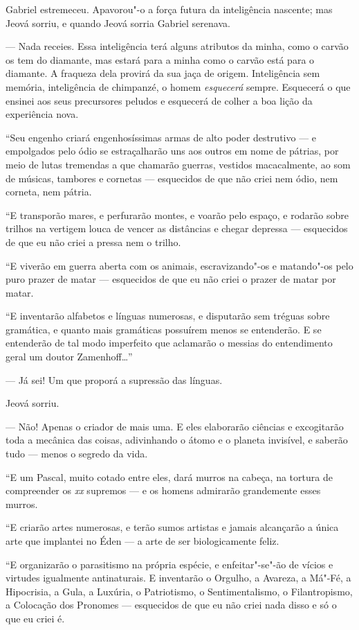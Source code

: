 Gabriel estremeceu. Apavorou"-o a força futura da inteligência nascente;
mas Jeová sorriu, e quando Jeová sorria Gabriel serenava.

--- Nada receies. Essa inteligência terá alguns atributos da minha, como
o carvão os tem do diamante, mas estará para a minha como o carvão está
para o diamante. A fraqueza dela provirá da sua jaça de origem.
Inteligência sem memória, inteligência de chimpanzé, o homem
\emph{esquecerá} sempre. Esquecerá o que ensinei aos seus precursores
peludos e esquecerá de colher a boa lição da experiência nova.

``Seu engenho criará engenhosíssimas armas de alto poder destrutivo ---
e empolgados pelo ódio se estraçalharão uns aos outros em nome de
pátrias, por meio de lutas tremendas a que chamarão guerras, vestidos
macacalmente, ao som de músicas, tambores e cornetas --- esquecidos de
que não criei nem ódio, nem corneta, nem pátria.

``E transporão mares, e perfurarão montes, e voarão pelo espaço, e
rodarão sobre trilhos na vertigem louca de vencer as distâncias e chegar
depressa --- esquecidos de que eu não criei a pressa nem o trilho.

``E viverão em guerra aberta com os animais, escravizando"-os e
matando"-os pelo puro prazer de matar --- esquecidos de que eu não criei
o prazer de matar por matar.

``E inventarão alfabetos e línguas numerosas, e disputarão sem tréguas
sobre gramática, e quanto mais gramáticas possuírem menos se entenderão.
E se entenderão de tal modo imperfeito que aclamarão o messias do
entendimento geral um doutor Zamenhoff\ldots{}''

--- Já sei! Um que proporá a supressão das línguas.

Jeová sorriu.

--- Não! Apenas o criador de mais uma. E eles elaborarão ciências e
excogitarão toda a mecânica das coisas, adivinhando o átomo e o planeta
invisível, e saberão tudo --- menos o segredo da vida.

``E um Pascal, muito cotado entre eles, dará murros na cabeça, na
tortura de compreender os \emph{xx} supremos --- e os homens admirarão
grandemente esses murros.

``E criarão artes numerosas, e terão sumos artistas e jamais alcançarão
a única arte que implantei no Éden --- a arte de ser biologicamente
feliz.

``E organizarão o parasitismo na própria espécie, e enfeitar"-se"-ão de
vícios e virtudes igualmente antinaturais. E inventarão o Orgulho, a
Avareza, a Má"-Fé, a Hipocrisia, a Gula, a Luxúria, o Patriotismo, o
Sentimentalismo, o Filantropismo, a Colocação dos Pronomes ---
esquecidos de que eu não criei nada disso e só o que eu criei é.

